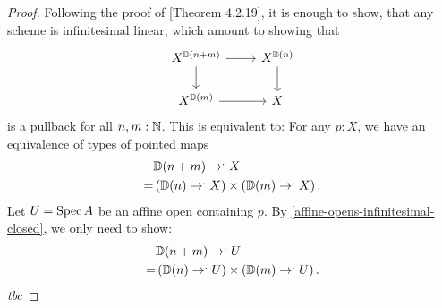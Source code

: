 \begin{proof}
  Following the proof of \cite{david-orbifolds}[Theorem 4.2.19],
  it is enough to show, that any scheme is infinitesimal linear,
  which amount to showing that
  \[
    \begin{tikzcd}
      X^{\D(n+m)}\ar[r]\ar[d] & X^{\D(n)}\ar[d] \\
      X^{\D(m)}\ar[r]         & X
    \end{tikzcd}
  \]
  is a pullback for all $n,m:\mathbb{N}$.
  This is equivalent to:
  For any $p:X$, we have an equivalence of types of pointed maps
  \begin{align*}
    &\mathbb{D}(n+m)\to^.X \\
    = &\left(\mathbb{D}(n)\to^.X\right) \times \left({\mathbb{D}(m)}\to^.X\right).
  \end{align*}
  Let $U=\operatorname{Spec} A$ be an affine open containing $p$.
  By \cref{affine-opens-infinitesimal-closed},
  we only need to show:
  \begin{align*}
    &\mathbb{D}(n+m)\to^.U \\
    = &\left(\mathbb{D}(n)\to^.U\right) \times \left({\mathbb{D}(m)}\to^.U\right).
  \end{align*}
  \emph{tbc}
\end{proof}
